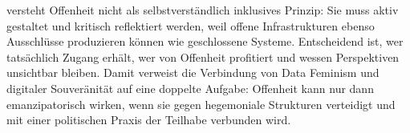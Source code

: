 \textcite{wilshireTimeRebootFeminism2024} versteht Offenheit nicht als selbstverständlich inklusives Prinzip: Sie muss aktiv gestaltet und kritisch reflektiert werden, weil offene Infrastrukturen ebenso Ausschlüsse produzieren können wie geschlossene Systeme. Entscheidend ist, wer tatsächlich Zugang erhält, wer von Offenheit profitiert und wessen Perspektiven unsichtbar bleiben. Damit verweist die Verbindung von Data Feminism und digitaler Souveränität auf eine doppelte Aufgabe: Offenheit kann nur dann emanzipatorisch wirken, wenn sie gegen hegemoniale Strukturen verteidigt und mit einer politischen Praxis der Teilhabe verbunden wird.